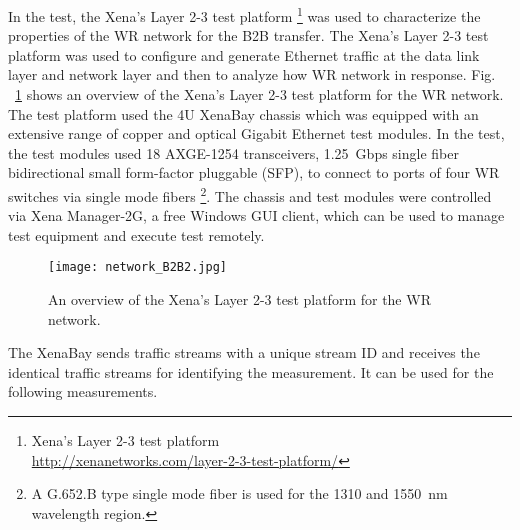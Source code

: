 In the test, the Xena's Layer 2-3 test platform \footnote{Xena's Layer 2-3 test platform\\ \url{http://xenanetworks.com/layer-2-3-test-platform/}} was used to characterize the properties of the WR network for the B2B transfer. The Xena's Layer 2-3 test platform was used to configure and generate Ethernet traffic at the data link layer and network layer and then to analyze how WR network in response. Fig. ~\ref{network_B2B2} shows an overview of the Xena's Layer 2-3 test platform for the WR network. The test platform used the 4U XenaBay chassis which was equipped with an extensive range of copper and optical Gigabit Ethernet test modules. In the test, the test modules used 18 AXGE-1254 transceivers, \SI{1.25}{Gbps} single fiber bidirectional small form-factor pluggable (SFP), to connect to ports of four WR switches via single mode fibers \footnote{A G.652.B type single mode fiber is used for the 1310 and \SI{1550}{nm} wavelength region.}. The chassis and test modules were controlled via Xena Manager-2G, a free Windows GUI client, which can be used to manage test equipment and execute test remotely. 
\begin{figure}[H]
   \centering   
   \texttt{[image: network\_B2B2.jpg]}
   \caption{An overview of the Xena's Layer 2-3 test platform for the WR network.}
   \label{network_B2B2}
\end{figure}

The XenaBay sends traffic streams with a unique stream ID and receives the identical traffic streams for identifying the measurement. It can be used for the following measurements.

